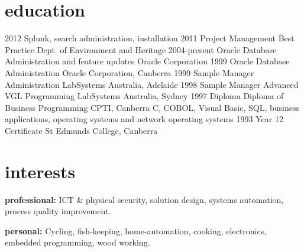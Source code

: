 \documentclass[]{friggeri-cv} %
\begin{document}
{\section{education}
\begin{entrylist}
\entry
{2012}
{Splunk, search administration, installation}
{ }
{ }
\entry
{2011}
{Project Management Best Practice}
{Dept. of Environment and Heritage}
{ }
\entry
{2004-present}
{Oracle {\normalfont Database Administration and feature updates}}
{Oracle Corporation}
{ }
\entry
{1999}
{Oracle {\normalfont Database Administration}}
{Oracle Corporation, Canberra}
{ }
\entry
{1999}
{Sample Manager {\normalfont Administration}}
{LabSystems Australia, Adelaide}
{ }
\entry
{1998}
{Sample Manager {\normalfont Advanced VGL Programming}}
{LabSystems Australia, Sydney}
{ }
\entry
{1997}
{Diploma {\normalfont Diploma of Business Programming}}
{CPTI, Canberra}
{C, COBOL, Visual Basic, SQL, business applications, operating systems and network operating systems}
\entry
{1993}
{Year 12 Certificate}
{St Edmunds College, Canberra}
{ }
\end{entrylist}



\section{interests}

\textbf{professional:} ICT \& physical security, solution design, systems automation, process quality improvement.

\textbf{personal:} Cycling, fish-keeping, home-automation, cooking, electronics, embedded programming, wood working.

} %
\end{document}
